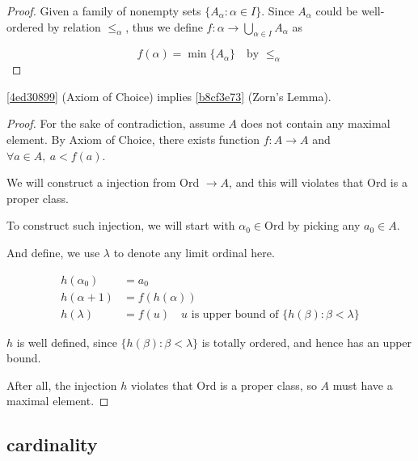 \begin{proof}
    Given a family of nonempty sets $\{A_{\alpha}: \alpha \in I \}$. Since $A_{\alpha}$ could be well-ordered by 
    relation $\le_{\alpha}$, thus we define $f: \alpha \to \bigcup_{\alpha \in I} A_{\alpha}$ as

    \[
        f(\alpha) = \min \{ A_{\alpha} \} \quad \text{by } \le_{\alpha} 
    \]
\end{proof}

\begin{thm}
    \cref{4ed30899} (Axiom of Choice) implies \cref{b8cf3e73} (Zorn's Lemma).
\end{thm}

\begin{proof}
    For the sake of contradiction, assume $A$ does not contain any maximal element.
    By Axiom of Choice, there exists function $f: A \to A$ and $\forall a \in A,\: a < f(a)$.

    We will construct a injection from Ord $\to A$, and this will violates that Ord is a proper class.

    To construct such injection, we will start with $\alpha_0 \in \mathrm{Ord}$ by picking any $a_0 \in A$.

    And define, we use $\lambda$ to denote any limit ordinal here.

    \begin{align*}
        h(\alpha_0) &= a_0 \\
        h(\alpha + 1) &= f(h(\alpha)) \\
        h(\lambda) & = f(u) \quad u \text{ is upper bound of } \{ h(\beta): \beta < \lambda \}
    \end{align*}

    $h$ is well defined, since $\{ h(\beta): \beta < \lambda \}$ is totally ordered, and hence has an upper bound.

    After all, the injection $h$ violates that Ord is a proper class, so $A$ must have a maximal element.
\end{proof}

\subsection{cardinality}

